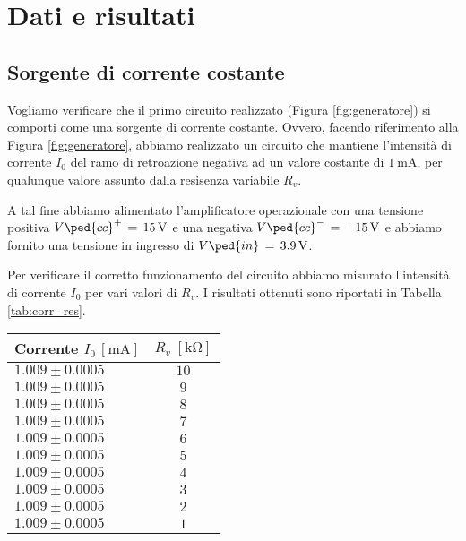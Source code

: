 \section*{Dati e risultati}

\subsection*{Sorgente di corrente costante}

Vogliamo verificare che il primo circuito realizzato (Figura \ref{fig:generatore}) si comporti come una sorgente di corrente costante. Ovvero, facendo riferimento alla Figura \ref{fig:generatore}, abbiamo realizzato un circuito che mantiene l'intensità di corrente $I_0$ del ramo di retroazione negativa ad un valore costante di $\SI{1}{\milli\ampere}$, per qualunque valore assunto dalla resisenza variabile $R_v$.

A tal fine abbiamo alimentato l'amplificatore operazionale con una tensione positiva $V\ped{cc}^+\,=\,\SI{+15}{\volt}$ e una negativa $V\ped{cc}^-\,=\,\SI{-15}{\volt}$ e abbiamo fornito una tensione in ingresso di $V\ped{in}\,=\,\SI{+3.9}{\volt}$.

Per verificare il corretto funzionamento del circuito abbiamo misurato l'intensità di corrente $I_0$ per vari valori di $R_v$. I risultati ottenuti sono riportati in Tabella \ref{tab:corr_res}.


\begin{SCtable}[2]
    \centering
    \small
    \begin{tabular}{l | c}
        \toprule
		Corrente $I_0 \, [\si{\milli\ampere}]$ & $R_v \; [\si{\kilo\ohm}]$ \\
        \midrule
		$ 1.009 \pm 0.0005 $ & $ 10 $ \\
		$ 1.009 \pm 0.0005 $ & $ 9 $ \\
		$ 1.009 \pm 0.0005 $ & $ 8 $ \\
		$ 1.009 \pm 0.0005 $ & $ 7 $ \\
		$ 1.009 \pm 0.0005 $ & $ 6 $ \\
		$ 1.009 \pm 0.0005 $ & $ 5 $ \\
		$ 1.009 \pm 0.0005 $ & $ 4 $ \\
		$ 1.009 \pm 0.0005 $ & $ 3 $ \\
		$ 1.009 \pm 0.0005 $ & $ 2 $ \\
		$ 1.009 \pm 0.0005 $ & $ 1 $ \\
        \bottomrule
    \end{tabular}
    \caption{In questa tabella sono riportati i valori dell'intensità di corrente $I_0$, passante per il ramo di retroazione negativa del circuito in Figura \ref{fig:generatore}, al variare della resisenza $R_v$. Come è possibile osservare il valore di $I_0$ rimane costante per qualunque valore assunto da $R_v$. Facciamo inoltre notare che, al fine di verificare il funzionamento del circuito, la sensibilità del multimetro, usato per misurate $I_0$, risulta eccessiva. Infine la mancanza dell'errore sui valoridi $R_v$ è approfondita nel paragrafo seguente.}
    \label{tab:corr_res}
\end{SCtable}

